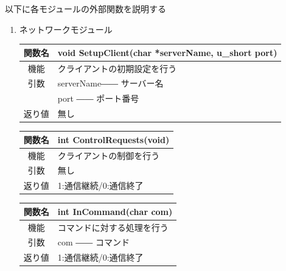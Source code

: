 \documentclass{jarticle}
\begin{document}
以下に各モジュールの外部関数を説明する
\begin{enumerate}
    \item ネットワークモジュール
    \begin{table}[H]
        \label{table:fanc_c1-1}
        \begin{center}
            \begin{tabular}{|c||p{30em}|}\hline
                関数名&void SetupClient(char *serverName, u\_short port) \\\hline
                機能&クライアントの初期設定を行う\\
                引数&serverName―― サーバー名\\
                &port ―― ポート番号\\
                返り値&無し\\\hline
            \end{tabular}
        \end{center}
    \end{table}
    \begin{table}[H]
        \label{table:fanc_c1-2}
        \begin{center}
            \begin{tabular}{|c||p{30em}|}\hline
                関数名&int ControlRequests(void) \\\hline
                機能&クライアントの制御を行う\\
                引数&無し\\
                返り値&1:通信継続/0:通信終了\\\hline
            \end{tabular}
        \end{center}
    \end{table}
    \begin{table}[H]
        \label{table:fanc_c1-3}
        \begin{center}
            \begin{tabular}{|c||p{30em}|}\hline
                関数名&int InCommand(char com) \\\hline
                機能&コマンドに対する処理を行う\\
                引数&com ―― コマンド\\
                返り値&1:通信継続/0:通信終了\\\hline
            \end{tabular}
        \end{center}
    \end{table}

\end{enumerate}
\end{document}
